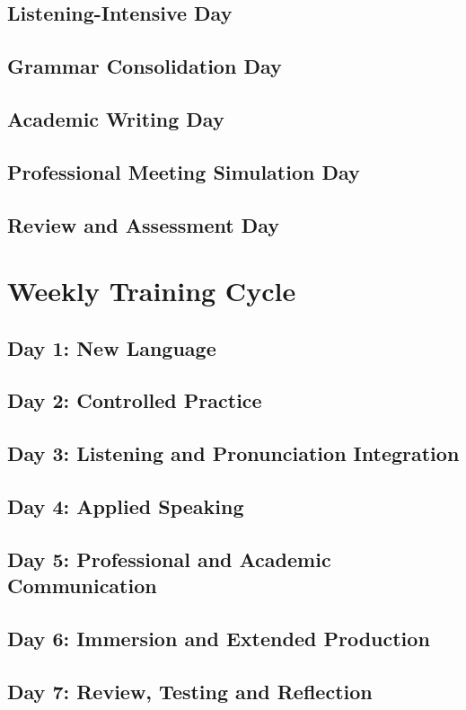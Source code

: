 \subsection{Listening-Intensive Day}
\subsection{Grammar Consolidation Day}
\subsection{Academic Writing Day}
\subsection{Professional Meeting Simulation Day}
\subsection{Review and Assessment Day}

\section{Weekly Training Cycle}
\subsection{Day 1: New Language}
\subsection{Day 2: Controlled Practice}
\subsection{Day 3: Listening and Pronunciation Integration}
\subsection{Day 4: Applied Speaking}
\subsection{Day 5: Professional and Academic Communication}
\subsection{Day 6: Immersion and Extended Production}
\subsection{Day 7: Review, Testing and Reflection}